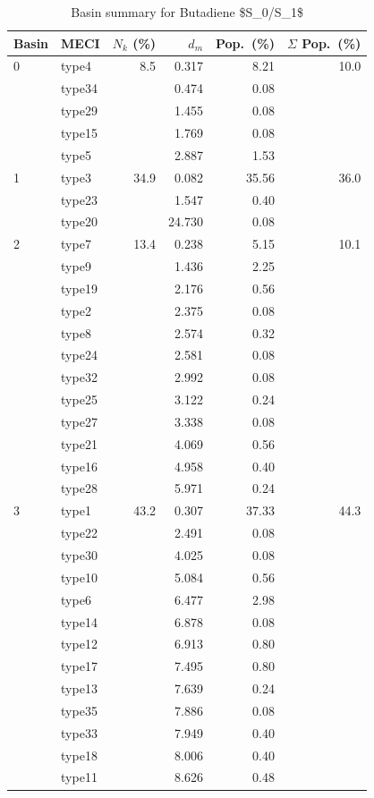 \begin{table}[htbp]
\centering
\caption{Basin summary for Butadiene \$S_0/S_1\$}
\begin{tabular}{llrrrr}
\hline
Basin & MECI & $N_k$ (\%) & $d_m$ & Pop.\ (\%) & $\Sigma$ Pop.\ (\%) \\
\hline
0 & type4 & 8.5 & 0.317 & 8.21 & 10.0 \\
 & type34 &  & 0.474 & 0.08 &  \\
 & type29 &  & 1.455 & 0.08 &  \\
 & type15 &  & 1.769 & 0.08 &  \\
 & type5 &  & 2.887 & 1.53 &  \\
\hline
1 & type3 & 34.9 & 0.082 & 35.56 & 36.0 \\
 & type23 &  & 1.547 & 0.40 &  \\
 & type20 &  & 24.730 & 0.08 &  \\
\hline
2 & type7 & 13.4 & 0.238 & 5.15 & 10.1 \\
 & type9 &  & 1.436 & 2.25 &  \\
 & type19 &  & 2.176 & 0.56 &  \\
 & type2 &  & 2.375 & 0.08 &  \\
 & type8 &  & 2.574 & 0.32 &  \\
 & type24 &  & 2.581 & 0.08 &  \\
 & type32 &  & 2.992 & 0.08 &  \\
 & type25 &  & 3.122 & 0.24 &  \\
 & type27 &  & 3.338 & 0.08 &  \\
 & type21 &  & 4.069 & 0.56 &  \\
 & type16 &  & 4.958 & 0.40 &  \\
 & type28 &  & 5.971 & 0.24 &  \\
\hline
3 & type1 & 43.2 & 0.307 & 37.33 & 44.3 \\
 & type22 &  & 2.491 & 0.08 &  \\
 & type30 &  & 4.025 & 0.08 &  \\
 & type10 &  & 5.084 & 0.56 &  \\
 & type6 &  & 6.477 & 2.98 &  \\
 & type14 &  & 6.878 & 0.08 &  \\
 & type12 &  & 6.913 & 0.80 &  \\
 & type17 &  & 7.495 & 0.80 &  \\
 & type13 &  & 7.639 & 0.24 &  \\
 & type35 &  & 7.886 & 0.08 &  \\
 & type33 &  & 7.949 & 0.40 &  \\
 & type18 &  & 8.006 & 0.40 &  \\
 & type11 &  & 8.626 & 0.48 &  \\
\hline
\end{tabular}
\end{table}

